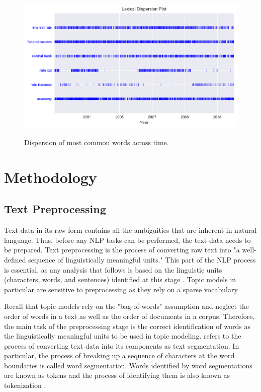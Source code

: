 \documentclass[11pt,a4paper,english,oneside]{book}
\numberwithin{equation}{chapter}
\begin{document}
\begin{figure}
	\caption{Dispersion of most common words across time.}
	\centering
	\includegraphics[scale=1]{Images/dispersionplot1.pdf}
	\label{dispersion}
\end{figure}

	


\section{Methodology}


\subsection{Text Preprocessing}\label{preprocessing}
Text data in its raw form contains all the ambiguities that are inherent in natural language. Thus, before any NLP tasks can be performed, the text data needs to be prepared. Text preprocessing is the process of converting raw text into "a well-defined sequence of linguistically meaningful units." This part of the NLP process is essential, as any analysis that follows is based on the linguistic units (characters, words, and sentences) identified at this stage \cite[p. 9]{Palmer.2010}. Topic models in particular are sensitive to preprocessing as they rely on a sparse vocabulary \cite[p. 288]{Schofield.2016}

Recall that topic models rely on the "bag-of-words" assumption and neglect the order of words in a text as well as the order of documents in a corpus. Therefore, the main task of the preprocessing stage is the correct identification of words as the linguistically meaningful units to be used in topic modeling. \citet[p. 10]{Palmer.2010} refers to the process of converting text data into its components as text segmentation. In particular, the process of breaking up a sequence of characters at the word boundaries is called word segmentation. Words identified by word segmentations are known as tokens and the process of identifying them is also known as tokenization \citep[p. 10]{Palmer.2010}.
\end{document}
